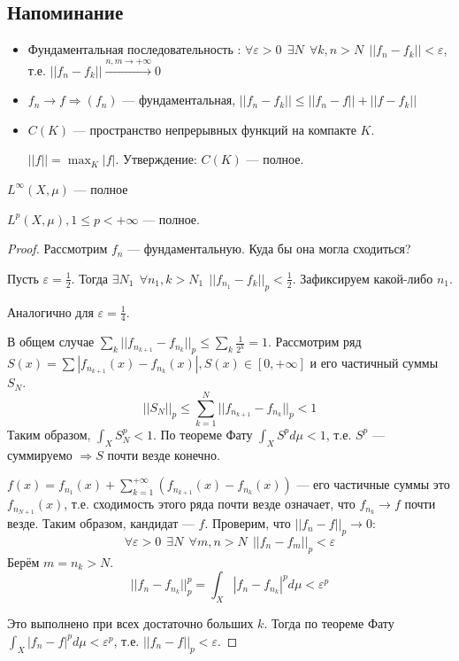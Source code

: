 \subsection{Напоминание}

\begin{itemize}
    \item Фундаментальная последовательность : \(\forall \varepsilon > 0 \ \ \exists N \ \ \forall k, n > N \ \ ||f_n - f_k|| < \varepsilon\), т.е. \(||f_n - f_k|| \xrightarrow{n,m \to +\infty} 0\)
    \item \(f_n \to f \Rightarrow  (f_n)\) --- фундаментальная, \(||f_n - f_k|| \leq  ||f_n - f|| + ||f - f_k||\)
    \item \(C(K)\) --- пространство непрерывных функций на компакте \(K\).

          \(||f|| = \max_K |f|\). Утверждение: \(C(K)\) --- полное.
\end{itemize}

\begin{exercise}
    \(L^{\infty}(X, \mu)\) --- полное %
\end{exercise}

\begin{theorem}
    \(L^p(X, \mu), 1 \leq p < +\infty\) --- полное.
\end{theorem}
\begin{proof}
    Рассмотрим \(f_n\) --- фундаментальную. Куда бы она могла сходиться?

    Пусть \(\varepsilon = \frac{1}{2}\). Тогда \(\exists N_1 \ \ \forall n_1, k > N_1 \ \ ||f_{n_1} - f_k||_p < \frac{1}{2}\). Зафиксируем какой-либо \(n_1\).

    Аналогично для \(\varepsilon = \frac{1}{4}\).

    В общем случае \(\sum_k ||f_{n_{k+1}} - f_{n_k}||_p \leq \sum_k \frac{1}{2^k} = 1\). Рассмотрим ряд \(S(x) = \sum |f_{n_{k+1}}(x) - f_{n_k}(x)|, S(x) \in [0, +\infty]\) и его частичный суммы \(S_N\).
    \[||S_N||_p \leq \sum_{k = 1}^N ||f_{n_{k+1}} - f_{n_k}||_p < 1\]
    Таким образом, \(\int_X S_N^p < 1\). По теореме Фату \(\int_X S^p d\mu < 1\), т.е. \(S^p\) --- суммируемо \( \Rightarrow S\) почти везде конечно.

    \(f(x) = f_{n_1}(x) + \sum_{k = 1}^{+\infty} (f_{n_{k+1}}(x) - f_{n_k}(x))\) --- его частичные суммы это \(f_{n_{N+1}}(x)\), т.е. сходимость этого ряда почти везде означает, что \(f_{n_k} \to f\) почти везде. Таким образом, кандидат --- \(f\). Проверим, что \(||f_n - f||_p \to 0\):
    \[\forall \varepsilon > 0 \ \ \exists N \ \ \forall m,n > N \ \ ||f_n - f_m||_p < \varepsilon\]
    Берём \(m = n_k > N\).
    \[||f_n - f_{n_k}||_p^p = \int_X |f_n - f_{n_k}|^p d\mu < \varepsilon^p\]

    Это выполнено при всех достаточно больших \(k\). Тогда по теореме Фату \(\int_X |f_n - f|^p d\mu < \varepsilon^p\), т.е. \(||f_n - f||_p < \varepsilon\).
\end{proof}

